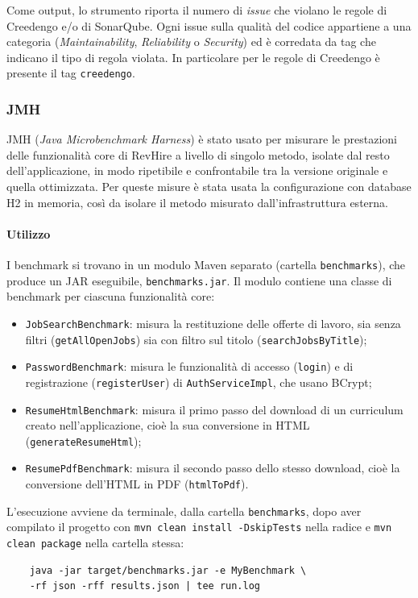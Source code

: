 \documentclass[12pt,a4paper]{article}
\begin{document}
    Come output, lo strumento riporta il numero di \emph{issue} che violano le
    regole di Creedengo e/o di SonarQube. Ogni issue sulla qualità del codice
    appartiene a una categoria (\emph{Maintainability}, \emph{Reliability} o
    \emph{Security}) ed è corredata da tag che indicano il tipo di regola
    violata. In particolare per le regole di Creedengo è presente il
    tag \texttt{creedengo}.

    \subsubsection{JMH}
    JMH (\emph{Java Microbenchmark Harness}) è stato usato per misurare le
    prestazioni delle funzionalità core di RevHire a livello di singolo metodo,
    isolate dal resto dell'applicazione, in modo ripetibile e confrontabile tra la
    versione originale e quella ottimizzata. Per queste misure è stata usata la
    configurazione con database H2 in memoria, così da isolare il metodo misurato
    dall'infrastruttura esterna.

    \paragraph{Utilizzo}
    I benchmark si trovano in un modulo Maven separato (cartella
    \texttt{benchmarks}), che produce un JAR eseguibile, \texttt{benchmarks.jar}.
    Il modulo contiene una classe di benchmark per ciascuna funzionalità core:
    \begin{itemize}
        \item \texttt{JobSearchBenchmark}: misura la restituzione delle offerte di
        lavoro, sia senza filtri (\texttt{getAllOpenJobs}) sia con filtro sul
        titolo (\texttt{searchJobsByTitle});
        \item \texttt{PasswordBenchmark}: misura le funzionalità di accesso
        (\texttt{login}) e di registrazione (\texttt{registerUser}) di
        \texttt{AuthServiceImpl}, che usano BCrypt;
        \item \texttt{ResumeHtmlBenchmark}: misura il primo passo del download di un
        curriculum creato nell'applicazione, cioè la sua conversione in HTML
        (\texttt{generateResumeHtml});
        \item \texttt{ResumePdfBenchmark}: misura il secondo passo dello stesso
        download, cioè la conversione dell'HTML in PDF (\texttt{htmlToPdf}).
    \end{itemize}
    L'esecuzione avviene da terminale, dalla cartella \texttt{benchmarks}, dopo
    aver compilato il progetto con \texttt{mvn clean install -DskipTests} nella
    radice e \texttt{mvn clean package} nella cartella stessa:
    \begin{verbatim}
    java -jar target/benchmarks.jar -e MyBenchmark \
    -rf json -rff results.json | tee run.log
    \end{verbatim}
\end{document}
